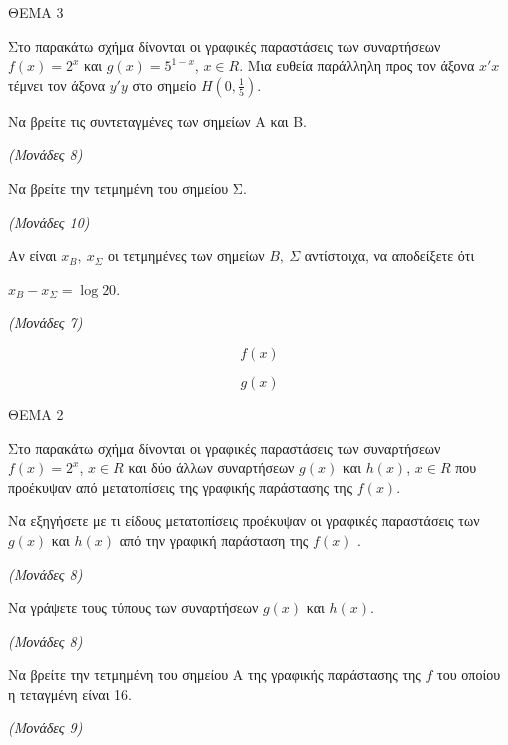 \documentclass[11pt,a4paper,twoside]{book}
\newcommand{\monades}[1]{\hfill \textit{(Μονάδες #1)}}
\begin{document}
\vspace{4mm}

ΘΕΜΑ 3

Στο παρακάτω σχήμα δίνονται οι γραφικές παραστάσεις των συναρτήσεων $f(x) = 2^{x}$ και $g(x) = 5^{1\ \mathbf{-}\ x}$, $x \in R$. Μια ευθεία παράλληλη προς τον άξονα $x'x$ τέμνει τον άξονα $y'y$ στο σημείο $Η\left( 0,\frac{1}{5} \right)$.

\begin{alist}
\item Να βρείτε τις συντεταγμένες των σημείων Α και Β.

\monades{8}

\item Να βρείτε την τετμημένη του σημείου Σ.

\monades{10}

\item Αν είναι $x_{B},\ x_{\Sigma}$ οι τετμημένες των σημείων $Β,\ \Sigma$ αντίστοιχα, να αποδείξετε ότι

$x_{B} - x_{\Sigma} = \log 20$.

\monades{7}

\begin{equation*}f(x)\end{equation*}

\begin{equation*}g(x)\end{equation*}
\end{alist}

\vspace{4mm}

ΘΕΜΑ 2

Στο παρακάτω σχήμα δίνονται οι γραφικές παραστάσεις των συναρτήσεων $f(x) = 2^{x}$, $x \in R$ και δύο άλλων συναρτήσεων $g(x)$ και $h(x)$, $x \in R$ που προέκυψαν από μετατοπίσεις της γραφικής παράστασης της $f(x)$.

\begin{alist}
\item Να εξηγήσετε με τι είδους μετατοπίσεις προέκυψαν οι γραφικές παραστάσεις των $g(x)$ και $h(x)$ από την γραφική παράσταση της $f(x)$ .

\monades{8}

\item Να γράψετε τους τύπους των συναρτήσεων $g(x)$ και $h(x)$.

\monades{8}

\item Να βρείτε την τετμημένη του σημείου Α της γραφικής παράστασης της $f$ του οποίου η τεταγμένη είναι 16.

\monades{9}
\end{alist}
\end{document}
